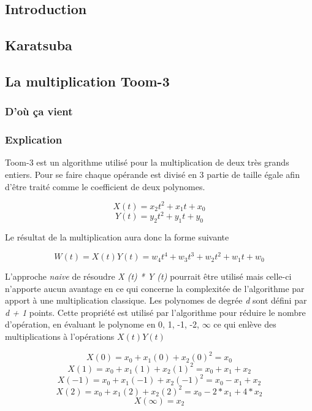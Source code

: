 \documentclass[letterpaper]{article}
\begin{document}
\subsection{Introduction}
\subsection{Karatsuba}

\subsection{La multiplication Toom-3}

\subsubsection{D'où ça vient}

\subsubsection{Explication}

Toom-3 est un algorithme utilisé pour  la multiplication de deux très grands
entiers. Pour se faire chaque opérande est divisé en 3 partie de taille égale
afin d'être traité comme le coefficient de deux polynomes.\cite{gmplib2014}

    $$X(t) = x_2 t^2 + x_1 t + x_0$$
    $$Y(t) = y_2 t^2 + y_1 t + y_0$$

Le résultat de la multiplication aura donc la forme suivante

    $$W(t) = X(t) Y(t) =  w_4 t^4 + w_3 t^3 + w_2 t^2 + w_1 t + w_0$$

L'approche \emph{naive} de résoudre \emph{X (t) * Y (t)} pourrait être utilisé
mais celle-ci n'apporte aucun avantage en ce qui concerne la complexitée de
l'algorithme par apport à une multiplication classique.\cite{gmplib2014}
\newline
Les polynomes de degrée \emph{d} sont défini par \emph{d + 1} points. Cette
propriété est utilisé par l'algorithme pour réduire le nombre d'opération, en
évaluant le polynome en 0, 1, -1, -2, $\infty$ ce qui enlève des multiplications
à l'opérations $X(t) Y(t)$\cite{wikitoom3}

    $$X (0) = x_{0} + x_{1} (0) + x_2 {(0)}^{2} = x_{0}$$
    $$X(1) = x_0 + x_1(1) + x_2{(1)}^2 = x_0 + x_1 + x_2$$
    $$X(-1) = x_0 + x_1(-1) + x_2{(-1)}^2 = x_0 - x_1 + x_2$$
    $$X(2) = x_0 + x_1(2) + x_2{(2)}^2 = x_0 - 2 * x_1 + 4 * x_2$$
    $$X(\infty) = x_2$$
\end{document}
